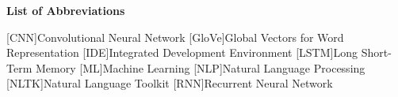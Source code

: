 \centerline{\large\textbf{List of Abbreviations}}

\vspace{1cm}

\begin{acronym}
        [CNN]{Convolutional Neural Network}
        [GloVe]{Global Vectors for Word Representation}
        [IDE]{Integrated Development Environment}
        [LSTM]{Long Short-Term Memory}
        [ML]{Machine Learning}
        [NLP]{Natural Language Processing}
        [NLTK]{Natural Language Toolkit}
        [RNN]{Recurrent Neural Network}
\end{acronym}
